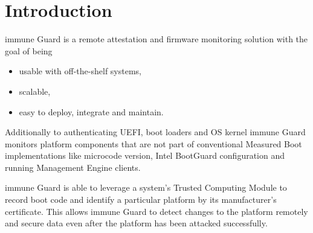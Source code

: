 \documentclass[a4paper,oneside,10pt,extrafontsizes]{memoir}
\begin{document}
\begin{titlingpage}

\begin{versionhistory}
\end{versionhistory}
\end{titlingpage}

\thispagestyle{empty}
\tableofcontents

\chapter{Introduction}
immune Guard is a remote attestation and firmware monitoring solution with the
goal of being

\begin{itemize}
  \item usable with off-the-shelf systems,
  \item scalable,
  \item easy to deploy, integrate and maintain.
\end{itemize}

Additionally to authenticating UEFI, boot loaders and OS kernel immune
Guard monitors platform components that are not part of conventional Measured
Boot implementations like microcode version, Intel BootGuard
configuration and running Management Engine clients. 

immune Guard is able to leverage a system's Trusted Computing Module to record
boot code and identify a particular platform by its manufacturer's certificate.
This allows immune Guard to detect changes to the platform remotely and secure
data even after the platform has been attacked successfully.
\end{document}
